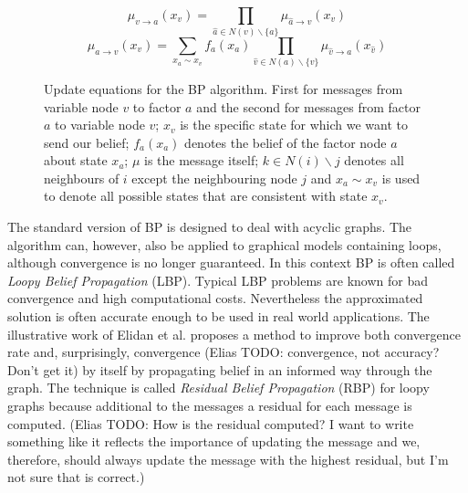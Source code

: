 \begin{figure}
\label{eqn:bp_message}
\begin{equation*}                                                            
\mu_{v\rightarrow a}(x_v) = \prod_{\hat a \in N(v)\backslash \{a\}} \mu_{\hat a\rightarrow v}(x_v)
\end{equation*}
\begin{equation*}                                                            
\mu_{a\rightarrow v}(x_v) = \sum_{x_a \sim x_v}f_a(x_a) \prod_{\hat v \in N(a)\backslash \{v\}} \mu_{\hat v\rightarrow a}(x_{\hat v})
\end{equation*}
\caption{Update equations for the BP algorithm. First for messages from variable node $v$ to factor $a$ and the second for messages from factor $a$ to variable node $v$; $x_v$ is the specific state for which we want to send our belief; $f_a(x_a)$ denotes the belief of the factor node $a$ about state $x_a$; $\mu$ is the message itself; $k \in N(i)\backslash j$ denotes all neighbours of $i$ except the neighbouring node $j$ and $x_a \sim x_v$ is used to denote all possible states that are consistent with state $x_v$.}
\end{figure}


The standard version of BP is designed to deal with acyclic graphs. The algorithm can, however, also be applied to graphical models containing loops, although convergence is no longer guaranteed. In this context BP is often called \textit{Loopy Belief Propagation} (LBP). Typical LBP problems are known for bad convergence and high computational costs. Nevertheless the approximated solution is often accurate enough to be used in real world applications. The illustrative work of Elidan et al. \cite{elidan2012residual} proposes a method to improve both convergence rate and, surprisingly, convergence (Elias TODO: convergence, not accuracy? Don't get it) by itself by propagating belief in an informed way through the graph. The technique is called \textit{Residual Belief Propagation} (RBP) for loopy graphs because additional to the messages a residual for each message is computed.
(Elias TODO: How is the residual computed? I want to write something like it reflects the importance of updating the message and we, therefore, should always update the message with the highest residual, but I'm not sure that is correct.)


